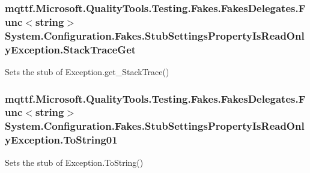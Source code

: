 \hypertarget{class_system_1_1_configuration_1_1_fakes_1_1_stub_settings_property_is_read_only_exception_adbe70225afa28cd9ecc534e5256cb80f}{
\subsubsection[{Stack\-Trace\-Get}]{\setlength{\rightskip}{0pt plus 5cm}mqttf.\-Microsoft.\-Quality\-Tools.\-Testing.\-Fakes.\-Fakes\-Delegates.\-Func$<$string$>$ System.\-Configuration.\-Fakes.\-Stub\-Settings\-Property\-Is\-Read\-Only\-Exception.\-Stack\-Trace\-Get}}\label{class_system_1_1_configuration_1_1_fakes_1_1_stub_settings_property_is_read_only_exception_adbe70225afa28cd9ecc534e5256cb80f}


Sets the stub of Exception.\-get\-\_\-\-Stack\-Trace()

\hypertarget{class_system_1_1_configuration_1_1_fakes_1_1_stub_settings_property_is_read_only_exception_a8f1f47aab5a47641d3dde0f7cc6d5a17}{
\subsubsection[{To\-String01}]{\setlength{\rightskip}{0pt plus 5cm}mqttf.\-Microsoft.\-Quality\-Tools.\-Testing.\-Fakes.\-Fakes\-Delegates.\-Func$<$string$>$ System.\-Configuration.\-Fakes.\-Stub\-Settings\-Property\-Is\-Read\-Only\-Exception.\-To\-String01}}\label{class_system_1_1_configuration_1_1_fakes_1_1_stub_settings_property_is_read_only_exception_a8f1f47aab5a47641d3dde0f7cc6d5a17}


Sets the stub of Exception.\-To\-String()



